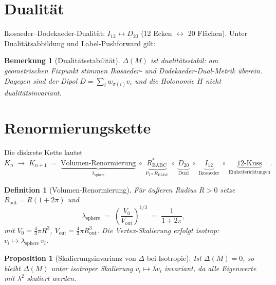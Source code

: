 \documentclass[11pt,a4paper]{article}
\newtheorem{definition}{Definition}
\newtheorem{remark}{Bemerkung}
\newtheorem{proposition}{Proposition}
\begin{document}
\section{Dualität}

Ikosaeder--Dodekaeder-Dualität: $I_{12}\leftrightarrow D_{20}$ (12 Ecken $\leftrightarrow$ 20 Flächen).
Unter Dualitätsabbildung und Label-Pushforward gilt:

\begin{remark}[Dualitätsstabilität]
$\Delta(M)$ ist \emph{dualitätsstabil}: am geometrischen Fixpunkt stimmen
Ikosaeder- und Dodekaeder-Dual-Metrik überein.
Dagegen sind der Dipol $D=\sum_i w_{\sigma(i)} v_i$ und die Holonomie $H$
\emph{nicht} dualitätsinvariant.
\end{remark}

\section{Renormierungskette}

Die diskrete Kette lautet
\[
  K_n \;\longrightarrow\; K_{n+1}
  \;=\;
  \underbrace{\text{Volumen-Renormierung}}_{\lambda_{\mathrm{sphere}}}
  \;\circ\;
  \underbrace{R^*_{\mathrm{EABC}}}_{P_I \circ R_{\mathrm{EABC}}}
  \;\circ\;
  \underbrace{D_{20}}_{\text{Dual}}
  \;\circ\;
  \underbrace{I_{12}}_{\text{Ikosaeder}}
  \;\circ\;
  \underbrace{\text{12-Kuss}}_{\text{Einheitsrichtungen}}.
\]

\begin{definition}[Volumen-Renormierung]
Für äußeren Radius $R>0$ setze $R_{\mathrm{out}}=R(1+2\pi)$ und
\[
  \lambda_{\mathrm{sphere}}
  \;=\;
  \left(\frac{V_0}{V_{\mathrm{out}}}\right)^{\!1/3}
  \;=\;
  \frac{1}{1+2\pi},
\]
mit $V_0=\tfrac{4}{3}\pi R^3$, $V_{\mathrm{out}}=\tfrac{4}{3}\pi R_{\mathrm{out}}^3$.
Die Vertex-Skalierung erfolgt isotrop: $v_i\mapsto \lambda_{\mathrm{sphere}}\,v_i$.
\end{definition}

\begin{proposition}[Skalierungsinvarianz von $\Delta$ bei Isotropie]
Ist $\Delta(M)=0$, so bleibt $\Delta(M)$ unter isotroper Skalierung
$v_i\mapsto\lambda v_i$ invariant, da alle Eigenwerte mit $\lambda^2$ skaliert werden.
\end{proposition}
\end{document}
